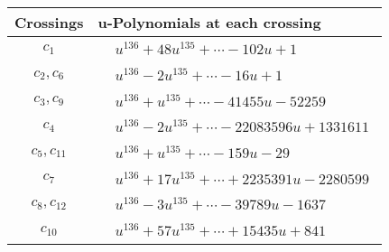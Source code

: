 \documentclass[1p]{elsarticle_modified}
\theoremstyle{definition}
\begin{document}
\begin{tabular}{m{50pt}|m{274pt}}
Crossings & \hspace{64pt}u-Polynomials at each crossing \\
\hline $$\begin{aligned}c_{1}\end{aligned}$$&$\begin{aligned}
&u^{136}+48 u^{135}+\cdots-102 u+1
\end{aligned}$\\
\hline $$\begin{aligned}c_{2},c_{6}\end{aligned}$$&$\begin{aligned}
&u^{136}-2 u^{135}+\cdots-16 u+1
\end{aligned}$\\
\hline $$\begin{aligned}c_{3},c_{9}\end{aligned}$$&$\begin{aligned}
&u^{136}+u^{135}+\cdots-41455 u-52259
\end{aligned}$\\
\hline $$\begin{aligned}c_{4}\end{aligned}$$&$\begin{aligned}
&u^{136}-2 u^{135}+\cdots-22083596 u+1331611
\end{aligned}$\\
\hline $$\begin{aligned}c_{5},c_{11}\end{aligned}$$&$\begin{aligned}
&u^{136}+u^{135}+\cdots-159 u-29
\end{aligned}$\\
\hline $$\begin{aligned}c_{7}\end{aligned}$$&$\begin{aligned}
&u^{136}+17 u^{135}+\cdots+2235391 u-2280599
\end{aligned}$\\
\hline $$\begin{aligned}c_{8},c_{12}\end{aligned}$$&$\begin{aligned}
&u^{136}-3 u^{135}+\cdots-39789 u-1637
\end{aligned}$\\
\hline $$\begin{aligned}c_{10}\end{aligned}$$&$\begin{aligned}
&u^{136}+57 u^{135}+\cdots+15435 u+841
\end{aligned}$\\
\hline
\end{tabular}\\~\\
\end{document}
